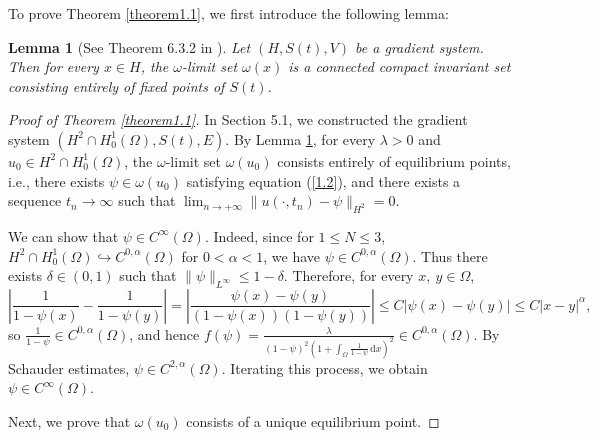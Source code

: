 \documentclass{article}
\numberwithin{equation}{section}
\newtheorem{lemma}{Lemma}[section]
\begin{document}
To prove Theorem \ref{theorem1.1}, we first introduce the following lemma:

\begin{lemma}[See Theorem 6.3.2 in \cite{ref8}]\label{lemma2.5}
    Let $(H,S(t),V)$ be a gradient system. Then for every $x\in H$, the $\omega$-limit set $\omega(x)$ is a connected compact invariant set consisting entirely of fixed points of $S(t)$.
\end{lemma}

\begin{proof}[Proof of Theorem \ref{theorem1.1}]
    In Section 5.1, we constructed the gradient system $(H^2\cap H_0^1(\Omega),S(t),E)$. By Lemma \ref{lemma2.5}, for every $\lambda>0$ and $u_0\in H^2\cap H_0^1(\Omega)$, the $\omega$-limit set $\omega(u_0)$ consists entirely of equilibrium points, i.e., there exists $\psi\in \omega(u_0)$ satisfying equation (\ref{1.2}), and there exists a sequence $t_n\to \infty$ such that $\lim_{n \to +\infty} \|u(\cdot,t_n)-\psi\|_{H^2}=0$.

    We can show that $\psi\in C^{\infty}(\Omega)$. Indeed, since for $1\le N\le 3$, $H^2\cap H_0^1(\Omega)\hookrightarrow C^{0,\alpha}(\Omega)$ for $0<\alpha<1$, we have $\psi\in C^{0,\alpha}(\Omega)$. Thus there exists $\delta\in (0,1)$ such that $\|\psi\|_{L^{\infty}}\le 1-\delta$. Therefore, for every $x,\ y\in \Omega$,
    $$\left|\frac{1}{1-\psi(x)}-\frac{1}{1-\psi(y)}\right|=\left|\frac{\psi(x)-\psi(y)}{(1-\psi(x))(1-\psi(y))}\right|\le C|\psi(x)-\psi(y)|\le C|x-y|^{\alpha},$$
    so $\frac{1}{1-\psi}\in C^{0,\alpha}(\Omega)$, and hence $f(\psi)=\frac{\lambda}{(1-\psi)^2(1+\int_{\Omega}\frac{1}{1-\psi}\,\mathrm{d}x)^2}\in C^{0,\alpha}(\Omega)$. By Schauder estimates, $\psi\in C^{2,\alpha}(\Omega)$. Iterating this process, we obtain $\psi\in C^{\infty}(\Omega)$.

    Next, we prove that $\omega(u_0)$ consists of a unique equilibrium point.


\end{proof}
\end{document}
